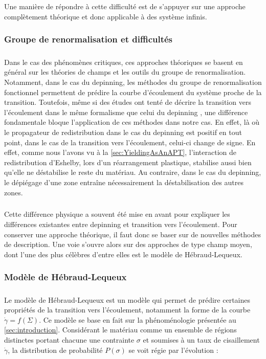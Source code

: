 \subparagraph{}Une manière de répondre à cette difficulté est de s'appuyer sur une approche complètement théorique et donc applicable à des système infinis.

\subsubsection{Groupe de renormalisation et difficultés}

\label{sec:TheoEPM}

\subparagraph{}Dans le cas des phénomènes critiques, ces approches théoriques se basent en général sur les théories de champs et les outils du groupe de renormalisation. Notamment, dans le cas du depinning, les méthodes du groupe de renormalisation fonctionnel permettent de prédire la courbe d'écoulement du système proche de la transition. Toutefois, même si des études ont tenté de décrire la transition vers l'écoulement dans le même formalisme que celui du depinning \cite{tyukodi_depinning_2016}, une différence fondamentale bloque l'application de ces méthodes dans notre cas. En effet, là où le propagateur de redistribution dans le cas du depinning est positif en tout point, dans le cas de la transition vers l'écoulement, celui-ci change de signe. En effet, comme nous l'avons vu à la \autoref{sec:YieldingAsAnAPT}, l'interaction de redistribution d'Eshelby, lors d'un réarrangement plastique, stabilise aussi bien qu'elle ne déstabilise le reste du matériau. Au contraire, dans le cas du depinning, le dépiégage d'une zone entraîne nécessairement la déstabilisation des autres zones.

\subparagraph{}Cette différence physique a souvent été mise en avant pour expliquer les différences existantes entre depinning et transition vers l'écoulement. Pour conserver une approche théorique, il faut donc se baser sur de nouvelles méthodes de description. Une voie s'ouvre alors sur des approches de type champ moyen, dont l'une des plus célèbres d'entre elles est le modèle de Hébraud-Lequeux.

\subsubsection{Modèle de Hébraud-Lequeux}

\label{sec:HL_def}

\subparagraph{}Le modèle de Hébraud-Lequeux \cite{hebraud_mode_coupling_1998} est un modèle qui permet de prédire certaines propriétés de la transition vers l'écoulement, notamment la forme de la courbe $\dot{\gamma} = f(\Sigma)$. Ce modèle se base en fait sur la phénoménologie présentée au \autoref{sec:introduction}. Considérant le matériau comme un ensemble de régions distinctes portant chacune une contrainte $\sigma$ et soumises à un taux de cisaillement $\dot{\gamma}$, la distribution de probabilité $P(\sigma)$ se voit régie par l'évolution :

